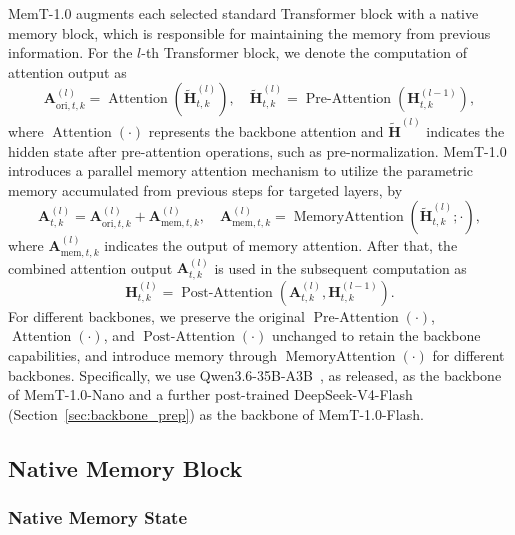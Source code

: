 MemT-1.0 augments each selected standard Transformer block with a native memory block, which is responsible for maintaining the memory from previous information.
For the $l$-th Transformer block, we denote the computation of attention output as 
\begin{equation*}
    \mathbf{A}^{(l)}_{\text{ori},t,k} = \operatorname{Attention}\left(\tilde{\mathbf{H}}^{(l)}_{t,k} \right), \quad \tilde{\mathbf{H}}^{(l)}_{t,k} = \operatorname{Pre-Attention}\left({\mathbf{H}}^{(l-1)}_{t,k} \right),
\end{equation*}
where $\operatorname{Attention}\left( \cdot \right)$ represents the backbone attention and $\tilde{\mathbf{H}}^{(l)}$ indicates the hidden state after pre-attention operations, such as pre-normalization.
MemT-1.0 introduces a parallel memory attention mechanism to utilize the parametric memory accumulated from previous steps for targeted layers, by
\begin{equation*}
    \mathbf{A}^{(l)}_{t,k} = \mathbf{A}^{(l)}_{\text{ori},t,k} + \mathbf{A}^{(l)}_{\text{mem},t,k}, \quad \mathbf{A}^{(l)}_{\text{mem},t,k} = \operatorname{MemoryAttention}\left( \tilde{\mathbf{H}}^{(l)}_{t,k}; \cdot \right),
\end{equation*}
where $\mathbf{A}^{(l)}_{\text{mem},t,k}$ indicates the output of memory attention.
After that, the combined attention output $\mathbf{A}^{(l)}_{t,k}$ is used in the subsequent computation as
\begin{equation*}
    \mathbf{H}^{(l)}_{t,k} = \operatorname{Post-Attention}\left( \mathbf{A}^{(l)}_{t,k}, {\mathbf{H}}^{(l-1)}_{t,k} \right).
\end{equation*}
For different backbones, we preserve the original $\operatorname{Pre-Attention}\left( \cdot \right)$, $\operatorname{Attention}\left( \cdot \right)$, and $\operatorname{Post-Attention}\left( \cdot \right)$ unchanged to retain the backbone capabilities, and introduce memory through $\operatorname{MemoryAttention}\left( \cdot \right)$ for different backbones.
Specifically, we use Qwen3.6-35B-A3B~\cite{qwen36_35b_a3b}, as released, as the backbone of MemT-1.0-Nano and a further post-trained DeepSeek-V4-Flash~\cite{deepseekai2026deepseekv4} (Section~\ref{sec:backbone_prep}) as the backbone of MemT-1.0-Flash.

\subsection{Native Memory Block}

\subsubsection{Native Memory State}

